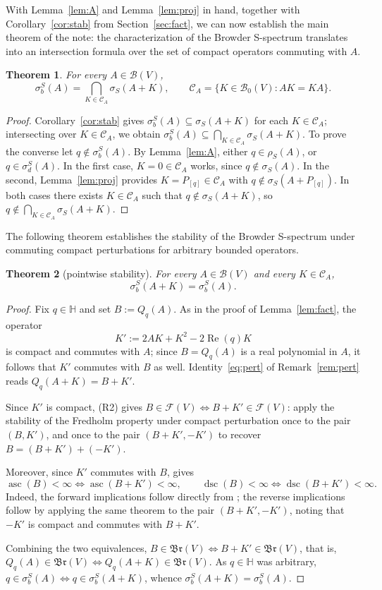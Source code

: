\documentclass[11pt,a4paper]{article}
\theoremstyle{plain}
\newtheorem{theorem}{Theorem}[section]
\theoremstyle{remark}
\newcommand{\HH}{\mathbb H}
\newcommand{\V}{V}
\newcommand{\B}{\mathcal B}
\newcommand{\Bo}{\mathcal B_0}
\newcommand{\F}{\mathcal F}
\newcommand{\Br}{\mathfrak{Br}}
\newcommand{\CA}{\mathcal C_A}
\newcommand{\sS}{\sigma_S}
\newcommand{\sigb}{\sigma_b^S}
\newcommand{\sd}{\sigma_d^S}
\newcommand{\rS}{\rho_S}
\DeclareMathOperator{\asc}{asc}
\DeclareMathOperator{\dsc}{dsc}
\newcommand{\Qq}[1]{Q_q(#1)}
\begin{document}
With Lemma~\ref{lem:A} and Lemma~\ref{lem:proj} in hand, together with Corollary~\ref{cor:stab} from Section~\ref{sec:fact}, we can now establish the main theorem of the note: the characterization of the Browder S-spectrum translates into an intersection formula over the set of compact operators commuting with $A$.

\begin{theorem}\label{thm:main}
For every $A\in\B(\V)$,
\[
\sigb(A)=\bigcap_{K\in\CA}\sS(A+K),\qquad \CA=\{K\in\Bo(\V):AK=KA\}.
\]
\end{theorem}

\begin{proof}
 Corollary~\ref{cor:stab} gives $\sigb(A)\subseteq\sS(A+K)$ for each $K\in\CA$; intersecting over $K\in\CA$, we obtain $\sigb(A)\subseteq\bigcap_{K\in\CA}\sS(A+K)$. To prove the converse let $q\notin\sigb(A)$. By Lemma~\ref{lem:A}, either $q\in\rS(A)$, or $q\in\sd(A)$. In the first case, $K=0\in\CA$ works, since $q\notin\sS(A)$. In the second, Lemma~\ref{lem:proj} provides $K=P_{[q]}\in\CA$ with $q\notin\sS(A+P_{[q]})$. In both cases there exists $K\in\CA$ such that $q\notin\sS(A+K)$, so $q\notin\bigcap_{K\in\CA}\sS(A+K)$.
\end{proof}

The following theorem establishes the stability of the Browder S-spectrum under commuting compact perturbations for arbitrary bounded operators.

\begin{theorem}[pointwise stability]\label{thm:pointwise}
For every $A\in\B(\V)$ and every $K\in\CA$,
\[
\sigb(A+K)=\sigb(A).
\]
\end{theorem}

\begin{proof}
Fix $q\in\HH$ and set $B:=\Qq{A}$. As in the proof of Lemma~\ref{lem:fact}, the operator
\[
K':=2AK+K^2-2\operatorname{Re}(q)K
\]
is compact and commutes with $A$; since $B=Q_q(A)$ is a real polynomial in $A$, it follows that $K'$ commutes with $B$ as well. Identity~\eqref{eq:pert} of Remark~\ref{rem:pert} reads $\Qq{A+K}=B+K'$.

Since $K'$ is compact, (R2) gives $B\in\F(\V)\iff B+K'\in\F(\V)$: apply the stability of the Fredholm property under compact perturbation once to the pair $(B,K')$, and once to the pair $(B+K',-K')$ to recover $B=(B+K')+(-K')$.

Moreover, since $K'$ commutes with $B$, \cite[Thm~3.9]{KD24} gives
\[
\asc(B)<\infty \iff \asc(B+K')<\infty,\qquad \dsc(B)<\infty \iff \dsc(B+K')<\infty.
\]
Indeed, the forward implications follow directly from \cite[Thm~3.9]{KD24}; the reverse implications follow by applying the same theorem to the pair $(B+K',-K')$, noting that $-K'$ is compact and commutes with $B+K'$.

Combining the two equivalences, $B\in\Br(\V)\iff B+K'\in\Br(\V)$, that is, $\Qq{A}\in\Br(\V)\iff\Qq{A+K}\in\Br(\V)$. As $q\in\HH$ was arbitrary, $q\in\sigb(A)\iff q\in\sigb(A+K)$, whence $\sigb(A+K)=\sigb(A)$.
\end{proof}
\end{document}
